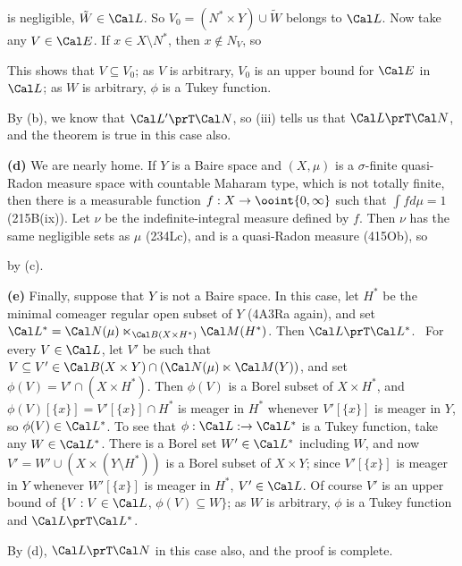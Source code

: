 {

\noindent is negligible, $\tilde W\in\Cal L$.   So $V_0=(N^*\times
Y)\cup\tilde W$ belongs to $\Cal L$.   Now take any $V\in\Cal E$.   If
$x\in X\setminus N^*$, then $x\notin N_V$, so


\noindent This shows that $V\subseteq V_0$;  as $V$ is arbitrary, $V_0$
is an upper bound for $\Cal E$ in $\Cal L$;  as $W$ is arbitrary, $\phi$
is a Tukey function.\ \Qed

\medskip

 By (b), we know that $\Cal L'\prT\Cal N$, so (iii)
tells us that $\Cal L\prT\Cal N$, and the theorem is true in this case
also.

\medskip

{\bf (d)} We are nearly home.   If $Y$ is a Baire space and $(X,\mu)$ is
a $\sigma$-finite quasi-Radon measure space with countable Maharam type,
which is not totally finite, then
there is a measurable function $f:X\to\ooint{0,\infty}$ such that
$\int fd\mu=1$ (215B(ix)).   Let $\nu$ be the indefinite-integral
measure defined by $f$.   Then $\nu$ has the same
negligible sets as $\mu$ (234Lc),
and is a quasi-Radon measure (415Ob), so


\noindent by (c).

\medskip

{\bf (e)} Finally, suppose that $Y$ is not a Baire space.   In this
case, let $H^*$ be the minimal
comeager regular open subset of $Y$ (4A3Ra again), and set
$\Cal L^*=\Cal N(\mu)\ltimes_{\Cal B(X\times H^*)}\Cal M(H^*)$.
Then $\Cal L\prT\Cal L^*$.
\Prf\ For every $V\in\Cal L$, let
$V'$ be such that
$V\subseteq V'\in\Cal B(X\times Y)\cap(\Cal N(\mu)\ltimes\Cal M(Y))$, and set
$\phi(V)=V'\cap(X\times H^*)$.   Then
$\phi(V)$ is a Borel subset of $X\times H^*$,
and $\phi(V)[\{x\}]=V'[\{x\}]\cap H^*$ is meager in $H^*$ whenever
$V'[\{x\}]$ is meager in $Y$, so $\phi(V)\in\Cal L^*$.   To see that
$\phi:\Cal L:\to\Cal L^*$ is
a Tukey function, take any $W\in\Cal L^*$.   There is a Borel set
$W'\in\Cal L^*$ including $W$, and now $V'=W'\cup(X\times(Y\setminus H^*))$
is a Borel subset of $X\times Y$;  since $V'[\{x\}]$ is meager in $Y$
whenever $W'[\{x\}]$ is meager in $H^*$, $V'\in\Cal L$.   Of course $V'$
is an upper bound
of $\{V:V\in\Cal L$, $\phi(V)\subseteq W\}$;  as $W$ is arbitrary,
$\phi$ is a Tukey function and $\Cal L\prT\Cal L^*$.\ \Qed

By (d), $\Cal L\prT\Cal N$ in this case also, and the proof is complete.
}%

